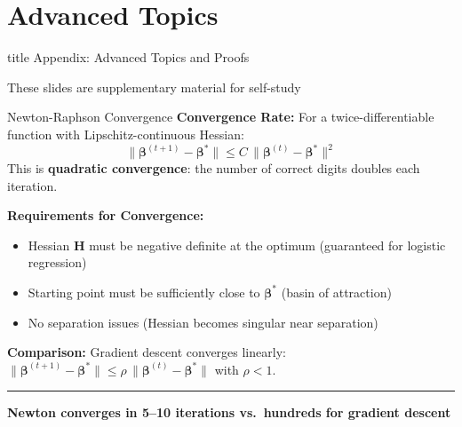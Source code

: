 \documentclass[8pt,aspectratio=169]{beamer}
\newcommand{\bottomnote}[1]{%
\vfill
\vspace{-2mm}
\textcolor{mllavender2}{\rule{\textwidth}{0.4pt}}
\vspace{1mm}
\footnotesize
\textbf{#1}
}
\begin{document}
\section*{Advanced Topics}

\begin{frame}[t]
\vfill
\centering
\begin{beamercolorbox}[sep=8pt,center]{title}
\Large Appendix: Advanced Topics and Proofs\par
\vspace{0.3em}
\normalsize These slides are supplementary material for self-study
\end{beamercolorbox}
\vfill
\end{frame}

\begin{frame}[t]{Newton-Raphson Convergence}
\textbf{Convergence Rate:}
For a twice-differentiable function with Lipschitz-continuous Hessian:
\begin{equation}
  \|\boldsymbol{\beta}^{(t+1)} - \boldsymbol{\beta}^*\| \leq C\,\|\boldsymbol{\beta}^{(t)} - \boldsymbol{\beta}^*\|^2
\end{equation}
This is \textbf{quadratic convergence}: the number of correct digits doubles each iteration.

\vspace{0.3em}
\textbf{Requirements for Convergence:}
\begin{itemize}
\item Hessian $\mathbf{H}$ must be negative definite at the optimum (guaranteed for logistic regression)
\item Starting point must be sufficiently close to $\boldsymbol{\beta}^*$ (basin of attraction)
\item No separation issues (Hessian becomes singular near separation)
\end{itemize}

\textbf{Comparison:} Gradient descent converges linearly: $\|\boldsymbol{\beta}^{(t+1)} - \boldsymbol{\beta}^*\| \leq \rho\,\|\boldsymbol{\beta}^{(t)} - \boldsymbol{\beta}^*\|$ with $\rho < 1$.
\bottomnote{Newton converges in 5--10 iterations vs.\ hundreds for gradient descent}
\end{frame}
\end{document}
